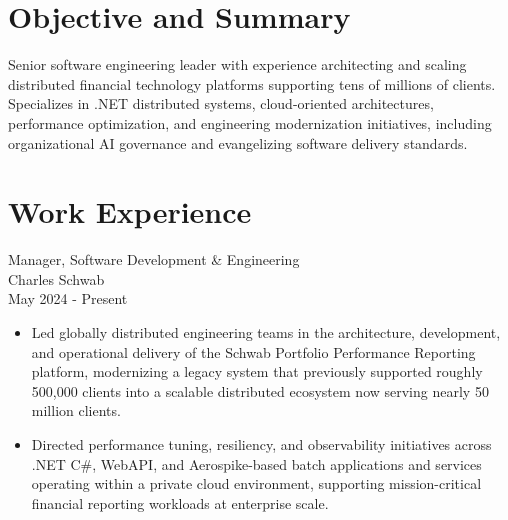 \documentclass[11pt]{res}
\begin{document}

\address{{\bf Current Address} \\
Austin, TX 78747 \\
(956)286-8386}

\address{{\bf Contact Information} \\
\href{https://jeremycantu.com}{jeremycantu.com} \\
\href{https://github.com/jac21}{github.com/jac21} \\
\href{mailto:mail@jeremycantu.com}{mail@jeremycantu.com}}

\begin{resume}

\section{Objective and Summary}

Senior software engineering leader with experience architecting and scaling distributed financial technology platforms supporting tens of millions of clients. Specializes in .NET distributed systems, cloud-oriented architectures, performance optimization, and engineering modernization initiatives, including organizational AI governance and evangelizing software delivery standards.

\section{Work Experience}

Manager, Software Development \& Engineering \\
Charles Schwab \\
May 2024 - Present
\vspace{0.08in}

\begin{itemize} \itemsep -2pt

\item Led globally distributed engineering teams in the architecture, development, and operational delivery of the Schwab Portfolio Performance Reporting platform, modernizing a legacy system that previously supported roughly 500,000 clients into a scalable distributed ecosystem now serving nearly 50 million clients.

\item Directed performance tuning, resiliency, and observability initiatives across .NET C\#, WebAPI, and Aerospike-based batch applications and services operating within a private cloud environment, supporting mission-critical financial reporting workloads at enterprise scale.


\end{itemize}
\end{resume}
\end{document}
